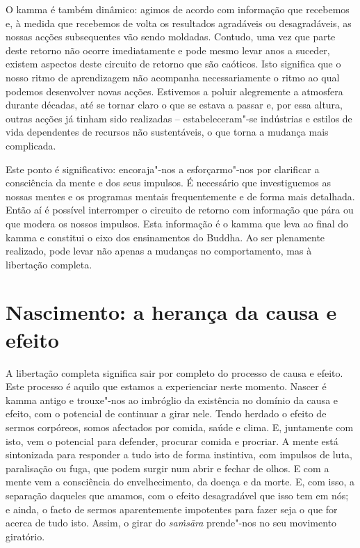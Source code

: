 O kamma é também dinâmico: agimos de acordo com informação que recebemos e, à
medida que recebemos de volta os resultados agradáveis ou desagradáveis, as
nossas acções subsequentes vão sendo moldadas. Contudo, uma vez que parte deste
retorno não ocorre imediatamente e pode mesmo levar anos a suceder, existem
aspectos deste circuito de retorno que são caóticos. Isto significa que o nosso
ritmo de aprendizagem não acompanha necessariamente o ritmo ao qual podemos
desenvolver novas acções. Estivemos a poluir alegremente a atmosfera durante
décadas, até se tornar claro o que se estava a passar e, por essa altura, outras
acções já tinham sido realizadas -- estabeleceram"-se indústrias e estilos de
vida dependentes de recursos não sustentáveis, o que torna a mudança mais
complicada.

Este ponto é significativo: encoraja"-nos a esforçarmo"-nos por clarificar a
consciência da mente e dos seus impulsos. É necessário que investiguemos as
nossas mentes e os programas mentais frequentemente e de forma mais detalhada.
Então aí é possível interromper o circuito de retorno com informação que pára ou
que modera os nossos impulsos. Esta informação é o kamma que leva ao final do
kamma e constitui o eixo dos ensinamentos do Buddha.
Ao ser plenamente realizado, pode levar não apenas a mudanças no
comportamento, mas à libertação completa.

\section{Nascimento: a herança da causa e efeito}

A libertação completa significa sair por completo do processo de causa e efeito.
Este processo é aquilo que estamos a experienciar neste momento. Nascer é kamma
antigo e trouxe"-nos ao imbróglio da existência no domínio da causa e efeito, com
o potencial de continuar a girar nele. Tendo herdado o efeito de sermos
corpóreos, somos afectados por comida, saúde e clima. E, juntamente com isto,
vem o potencial para defender, procurar comida e procriar. A mente está
sintonizada para responder a tudo isto de forma instintiva, com impulsos de
luta, paralisação ou fuga, que podem surgir num abrir e fechar de olhos. E com a
mente vem a consciência do envelhecimento, da doença e da morte. E, com isso, a
separação daqueles que amamos, com o efeito desagradável que isso tem em nós; e
ainda, o facto de sermos aparentemente impotentes para fazer seja o que for
acerca de tudo isto. Assim, o girar do \emph{saṁsāra} prende"-nos no seu
movimento giratório.

